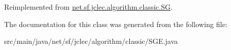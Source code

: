 Reimplemented from \hyperlink{classnet_1_1sf_1_1jclec_1_1algorithm_1_1classic_1_1_s_g_a3d948a919967ee8095ec90580e45e985}{net.\-sf.\-jclec.\-algorithm.\-classic.\-S\-G}.



The documentation for this class was generated from the following file\-:\begin{DoxyCompactItemize}
\item 
src/main/java/net/sf/jclec/algorithm/classic/S\-G\-E.\-java\end{DoxyCompactItemize}
